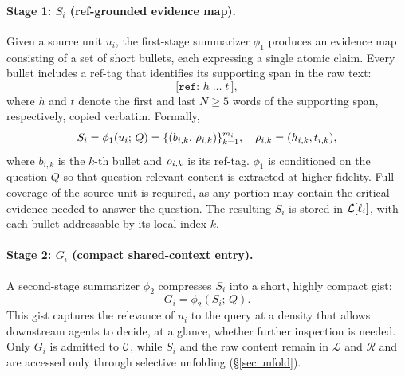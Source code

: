 \paragraph{Stage 1: $S_i$ (ref-grounded evidence map).}
Given a source unit $u_i$, the first-stage summarizer $\phi_1$ produces an evidence map consisting of a set of short bullets, each expressing a single atomic claim. Every bullet includes a {ref-tag} that identifies its supporting span in the raw text:
\begin{equation}
    \texttt{[ref: } h \;\ldots\; t\,\texttt{]},
\end{equation}
where $h$ and $t$ denote the first and last $N \geq 5$ words of the supporting span, respectively, copied verbatim. Formally,
\begin{equation}
    S_i = \phi_1(u_i;\, Q) = \{(b_{i,k},\, \rho_{i,k})\}_{k=1}^{m_i}, \quad \rho_{i,k} = (h_{i,k}, t_{i,k}),
\end{equation}
where $b_{i,k}$ is the $k$-th bullet and $\rho_{i,k}$ is its ref-tag. $\phi_1$ is conditioned on the question $Q$ so that question-relevant content is extracted at higher fidelity. Full coverage of the source unit is required, as any portion may contain the critical evidence needed to answer the question. The resulting $S_i$ is stored in $\mathcal{L}[\ell_i]$, with each bullet addressable by its local index $k$.


\paragraph{Stage 2: $G_i$ (compact shared-context entry).}
A second-stage summarizer $\phi_2$ compresses $S_i$ into a short, highly compact gist:
\begin{equation}
    G_i = \phi_2(S_i;\, Q).
\end{equation}
This gist captures the relevance of $u_i$ to the query at a density that allows downstream agents to decide, at a glance, whether further inspection is needed. Only $G_i$ is admitted to $\mathcal{C}$, while $S_i$ and the raw content remain in $\mathcal{L}$ and $\mathcal{R}$ and are accessed only through selective unfolding (\S\ref{sec:unfold}).


